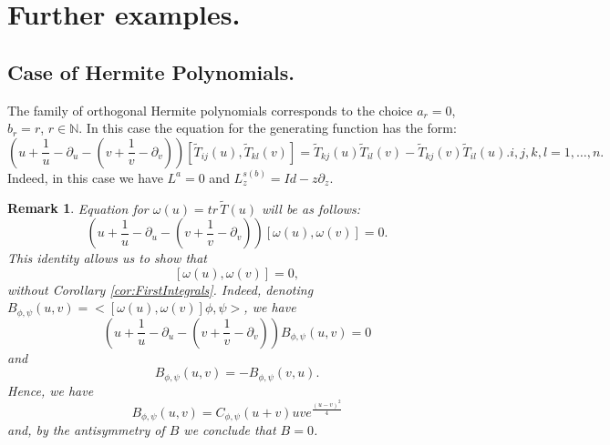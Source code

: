 \documentclass[10pt]{article}%
\numberwithin{equation}{section}
\newtheorem{rem}[thm]{Remark}
\begin{document}





\section{Further examples.}
\subsection{Case of Hermite Polynomials.}
The family of orthogonal Hermite polynomials corresponds to the choice $a_r=0$, $b_r=r$, $r\in\mathbb{N}$. In this case the equation for the generating function has the form: 
\[
\left(u+\frac{1}{u}-\partial_u-(v+\frac{1}{v}-\partial_v)\right)[\tilde{T}_{ij}(u),\tilde{T}_{kl}(v)]=\tilde{T}_{kj}(u)\tilde{T}_{il}(v)-\tilde{T}_{kj}(v)\tilde{T}_{il}(u).i,j,k,l=1,\ldots,n.
\]
Indeed, in this case we have $L^a=0$ and $L_z^{s(b)}=Id-z\partial_z$.

\begin{rem}
Equation for $\omega(u)= tr\,\tilde{T}(u) $ will be as follows:
\[
\left(u+\frac{1}{u}-\partial_u-(v+\frac{1}{v}-\partial_v)\right)[\omega(u), \omega(v)]=0.
\]
This identity allows us to show that 
\[
[\omega(u), \omega(v)]=0,
\]
without Corollary \ref{cor:FirstIntegrals}.
Indeed, denoting $B_{\phi,\psi}(u,v)=<[\omega(u), \omega(v)]\phi,\psi>$, we have 
\[
\left(u+\frac{1}{u}-\partial_u-(v+\frac{1}{v}-\partial_v)\right)B_{\phi,\psi}(u,v)=0
\]
and
\[
B_{\phi,\psi}(u,v)=-B_{\phi,\psi}(v,u).
\]
Hence, we have
\[
B_{\phi,\psi}(u,v)=C_{\phi,\psi}(u+v)uv e^{\frac{(u-v)^2}{4}}
\]
and, by the antisymmetry of $B$ we conclude that $B=0$. 
\end{rem}
\end{document}
